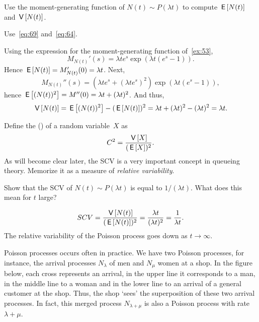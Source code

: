 \begin{exercise}
Use  the moment-generating function of $N(t)\sim P(\lambda t)$ to compute $\,\mathsf{E}\left[N(t)\right]$ and $\,\mathsf{V}\left[N(t)\right]$. 
\begin{hint}
Use~\cref{eq:69} and~\cref{eq:64}. 
\end{hint}
\begin{solution}
Using the expression for the moment-generating function of~\cref{ex:53},
  \begin{equation*}
    M_{N(t)}'(s) = \lambda t e^s \exp(\lambda t(e^s - 1)).
  \end{equation*}
Hence $\,\mathsf{E}\left[N(t)\right] = M_{N(t)}'(0) = \lambda t $. Next, 
  \begin{equation*}
    M_{N(t)}''(s) = (\lambda t e^s + (\lambda t e^s)^2) \exp(\lambda t(e^s - 1)),
  \end{equation*}
hence $\,\mathsf{E}\left[(N(t))^2\right] = M''(0) = \lambda t + (\lambda t)^2$. And thus, 
\begin{equation*}
\,\mathsf{V}\left[N(t)\right] =\,\mathsf{E}\left[(N(t))^2\right]-(\,\mathsf{E}\left[N(t)\right])^2 = \lambda t + (\lambda t)^2 - (\lambda t)^2 = \lambda t.
\end{equation*}
\end{solution}
\end{exercise}

Define the  () of a random variable~$X$ as 
\begin{equation}\label{eq:62}
  C^2= \frac{\,\mathsf{V}\left[X\right]}{(\,\mathsf{E}\left[X\right])^2}.
\end{equation}
As  will become clear later, the SCV is a very important concept in
  queueing theory. Memorize it as a measure of \emph{relative
  variability}.

\begin{exercise}
Show that   the SCV of $N(t)\sim P(\lambda t)$ is equal to $1/(\lambda t)$.  What does this mean for $t$ large?
\begin{solution}
    \begin{equation*}
SCV = \frac{\,\mathsf{V}\left[N(t)\right]}{(\,\mathsf{E}\left[N(t)\right])^2} = \frac{\lambda t}{(\lambda t)^2} = \frac1{\lambda t}.
    \end{equation*}
The relative variability of the Poisson process goes down as $t\to\infty$.  
\end{solution}
\end{exercise}




 Poisson processes occurs often in practice.
We have two Poisson processes, for instance, the arrival processes $N_\lambda$ of men and $N_\mu$ women at a shop.
In the figure below, each cross represents an arrival, in the upper line it corresponds to a man, in the middle line to a woman and in the lower line to an arrival of a general customer at the shop.
Thus, the shop `sees' the superposition of these two arrival processes.
In fact, this merged process $N_{\lambda+\mu}$ is also a Poisson process with rate $\lambda+\mu$.


